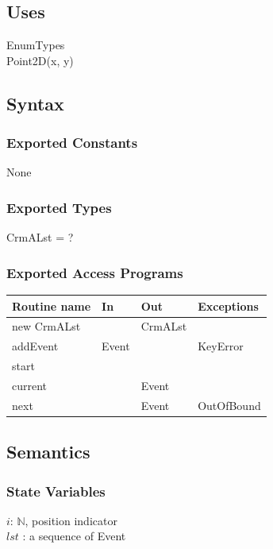 \documentclass[12pt]{article}
\begin{document}
\subsection* {Uses} 

EnumTypes\\
Point2D(x, y)\\

\subsection* {Syntax}

\subsubsection* {Exported Constants}

None

\subsubsection* {Exported Types}

CrmALst = ?

\subsubsection* {Exported Access Programs}

\begin{tabular}{| l | l | l | p{5cm} |}
\hline
\textbf{Routine name} & \textbf{In} & \textbf{Out} & \textbf{Exceptions}\\
\hline
new CrmALst & ~ & CrmALst & ~\\
\hline
addEvent & Event & ~ & KeyError\\
\hline
start & ~ & ~ & \\
\hline
current & ~ & Event & ~\\
\hline
next & ~ & Event & OutOfBound\\
\hline

\end{tabular}

\subsection* {Semantics}

\subsubsection* {State Variables}

$i$: $\mathbb{N}$, position indicator\\
$lst$ : a sequence of Event
\end{document}
